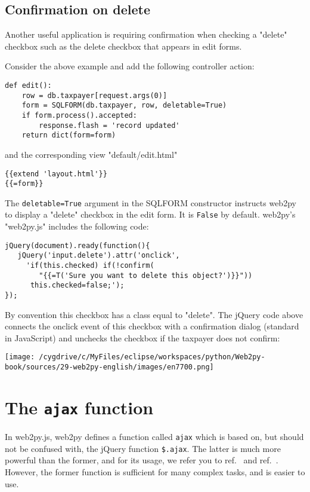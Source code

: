 \documentclass[justified,sixbynine,notoc]{tufte-book}
\def\ft{\small\tt}
\def\inxx#1{\index{#1}}
\begin{document}
\begin{fullwidth}
\goodbreak\subsection{Confirmation on delete}

\inxx{confirmation}

Another useful application is requiring confirmation when checking a "delete" checkbox such as the delete checkbox that appears in edit forms.

Consider the above example and add the following controller action:
\begin{lstlisting}
def edit():
    row = db.taxpayer[request.args(0)]
    form = SQLFORM(db.taxpayer, row, deletable=True)
    if form.process().accepted:
        response.flash = 'record updated'
    return dict(form=form)
\end{lstlisting}
\noindent and the corresponding view "default/edit.html"
\begin{lstlisting}[keywords={}]
{{extend 'layout.html'}}
{{=form}}
\end{lstlisting}

\inxx{deletable}
The {\ft deletable=True} argument in the SQLFORM constructor instructs web2py to display a "delete" checkbox in the edit form. It is {\ft False} by default.
\noindent web2py's "web2py.js" includes the following code:
\begin{lstlisting}
jQuery(document).ready(function(){
   jQuery('input.delete').attr('onclick',
     'if(this.checked) if(!confirm(
        "{{=T('Sure you want to delete this object?')}}"))
      this.checked=false;');
});
\end{lstlisting}

By convention this checkbox has a class equal to "delete". The jQuery code above connects the onclick event of this checkbox with a confirmation dialog (standard in JavaScript) and unchecks the checkbox if the taxpayer does not confirm:


\goodbreak\begin{center}\texttt{[image: /cygdrive/c/MyFiles/eclipse/workspaces/python/Web2py-book/sources/29-web2py-english/images/en7700.png]}\end{center}


\goodbreak\section{The {\ft ajax} function}

In web2py.js, web2py defines a function called {\ft ajax} which is based on, but should not be confused with, the jQuery function {\ft \$.ajax}. The latter is much more powerful than the former, and for its usage, we refer you to ref.~\cite{jquery} and ref.~\cite{jquery-b}. However, the former function is sufficient for many complex tasks, and is easier to use.


\end{fullwidth}
\end{document}
